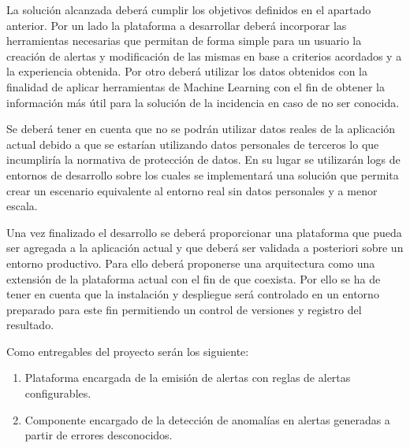 La solución alcanzada deberá cumplir los objetivos definidos en el apartado anterior. Por un lado la plataforma a desarrollar deberá incorporar las herramientas necesarias que permitan de forma simple para un usuario la creación de alertas y modificación de las mismas en base a criterios acordados y a la experiencia obtenida. Por otro deberá utilizar los datos obtenidos con la finalidad de aplicar herramientas de Machine Learning con el fin de obtener la información más útil para la solución de la incidencia en caso de no ser conocida.

Se deberá tener en cuenta que no se podrán utilizar datos reales de la aplicación actual debido a que se estarían utilizando datos personales de terceros lo que incumpliría la normativa de protección de datos. En su lugar se utilizarán logs de entornos de desarrollo sobre los cuales se implementará una solución que permita crear un escenario equivalente al entorno real sin datos personales y a menor escala.

Una vez finalizado el desarrollo se deberá proporcionar una plataforma que pueda ser agregada a la aplicación actual y que deberá ser validada a posteriori sobre un entorno productivo. Para ello deberá proponerse una arquitectura como una extensión de la plataforma actual con el fin de que coexista. Por ello se ha de tener en cuenta que la instalación y despliegue será controlado en un entorno preparado para este fin permitiendo un control de versiones y registro del resultado.

Como entregables del proyecto serán los siguiente:

\begin{enumerate}
\item Plataforma encargada de la emisión de alertas con reglas de alertas configurables.
\item Componente encargado de la detección de anomalías en alertas generadas a partir de errores desconocidos.
\end{enumerate}